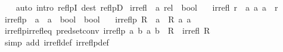 \begin{isabellebody}
%
\isadelimproof
\ \ %
\endisadelimproof
%
\isatagproof
{}\isamarkupfalse%
\ {\isacharparenleft}{\kern0pt}auto\ intro{\isacharcolon}{\kern0pt}\ reflpI\ dest{\isacharcolon}{\kern0pt}\ reflpD{\isacharparenright}{\kern0pt}%
\endisatagproof
{\isafoldproof}%
%
\isadelimproof
%
\endisadelimproof
%
\isadelimdocument
%
\endisadelimdocument
%
\isatagdocument
%
\isamarkuptrue%
%
\endisatagdocument
{\isafolddocument}%
%
\isadelimdocument
%
\endisadelimdocument
{}\isamarkupfalse%
\ irrefl\ {\isacharcolon}{\kern0pt}{\isacharcolon}{\kern0pt}\ {\isachardoublequoteopen}{\isacharprime}{\kern0pt}a\ rel\ {\isasymRightarrow}\ bool{\isachardoublequoteclose}\isanewline
\ \ \ {\isachardoublequoteopen}irrefl\ r\ {\isasymlongleftrightarrow}\ {\isacharparenleft}{\kern0pt}{\isasymforall}a{\isachardot}{\kern0pt}\ {\isacharparenleft}{\kern0pt}a{\isacharcomma}{\kern0pt}\ a{\isacharparenright}{\kern0pt}\ {\isasymnotin}\ r{\isacharparenright}{\kern0pt}{\isachardoublequoteclose}\isanewline
\isanewline
{}\isamarkupfalse%
\ irreflp\ {\isacharcolon}{\kern0pt}{\isacharcolon}{\kern0pt}\ {\isachardoublequoteopen}{\isacharparenleft}{\kern0pt}{\isacharprime}{\kern0pt}a\ {\isasymRightarrow}\ {\isacharprime}{\kern0pt}a\ {\isasymRightarrow}\ bool{\isacharparenright}{\kern0pt}\ {\isasymRightarrow}\ bool{\isachardoublequoteclose}\isanewline
\ \ \ {\isachardoublequoteopen}irreflp\ R\ {\isasymlongleftrightarrow}\ {\isacharparenleft}{\kern0pt}{\isasymforall}a{\isachardot}{\kern0pt}\ {\isasymnot}\ R\ a\ a{\isacharparenright}{\kern0pt}{\isachardoublequoteclose}\isanewline
\isanewline
{}\isamarkupfalse%
\ irreflp{\isacharunderscore}{\kern0pt}irrefl{\isacharunderscore}{\kern0pt}eq\ {\isacharbrackleft}{\kern0pt}pred{\isacharunderscore}{\kern0pt}set{\isacharunderscore}{\kern0pt}conv{\isacharbrackright}{\kern0pt}{\isacharcolon}{\kern0pt}\ {\isachardoublequoteopen}irreflp\ {\isacharparenleft}{\kern0pt}{\isasymlambda}a\ b{\isachardot}{\kern0pt}\ {\isacharparenleft}{\kern0pt}a{\isacharcomma}{\kern0pt}\ b{\isacharparenright}{\kern0pt}\ {\isasymin}\ R{\isacharparenright}{\kern0pt}\ {\isasymlongleftrightarrow}\ irrefl\ R{\isachardoublequoteclose}\isanewline
%
\isadelimproof
\ \ %
\endisadelimproof
%
\isatagproof
{}\isamarkupfalse%
\ {\isacharparenleft}{\kern0pt}simp\ add{\isacharcolon}{\kern0pt}\ irrefl{\isacharunderscore}{\kern0pt}def\ irreflp{\isacharunderscore}{\kern0pt}def{\isacharparenright}{\kern0pt}%
\endisatagproof
{\isafoldproof}%
%
\isadelimproof

\end{isabellebody}
